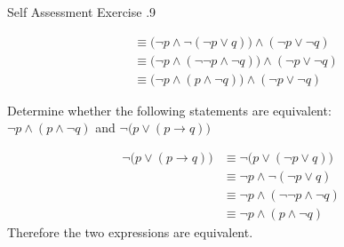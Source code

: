 \documentclass[\main/notes.tex]{subfiles}
\begin{document}
\begin{exercise}{Self Assessment Exercise \thechapter.9}
\begin{questions}
\begin{questions}
\begin{answer}
\begin{align*}
										& \equiv \bigl(\lnot p \land \lnot (\lnot p \lor q)\bigr) \land (\lnot p \lor \lnot q) \tag*{De Morgan's law}\\
										& \equiv \bigl(\lnot p \land (\lnot \lnot p \land \lnot q)\bigr) \land (\lnot p \lor \lnot q) \tag*{De Morgan's law}\\
										& \equiv \bigl(\lnot p \land (p \land \lnot q)\bigr) \land (\lnot p \lor \lnot q) \tag*{Double Negation}
									\end{align*}
								\end{answer}
						\end{questions}
					\item Determine whether the following statements are equivalent:\\ $\lnot p \land (p \land \lnot q)$ and $\lnot \bigl(p \lor (p \rightarrow q)\bigr)$
						\begin{answer}
							\begin{align*}
								\lnot \bigl(p \lor (p \rightarrow q)\bigr) &\equiv \lnot \bigl(p \lor (\lnot p \lor q)\bigr) \tag*{Implication}\\
								& \equiv \lnot p \land \lnot(\lnot p \lor q) \tag*{De Morgan's law}\\
								& \equiv \lnot p \land (\lnot \lnot p \land \lnot q) \tag*{De Morgan's law}\\
								& \equiv \lnot p \land (p \land \lnot q) \tag*{Double Negation}
							\end{align*}
							Therefore the two expressions are equivalent.
						\end{answer}
				\end{questions}
			\end{exercise}
\end{document}
